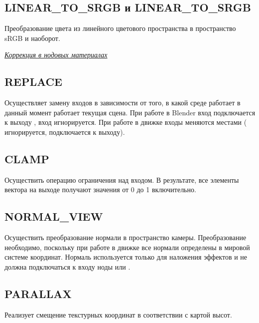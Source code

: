 \documentclass[a4paper,12pt,oneside]{sphinxmanual}
\begin{document}
\subsection{LINEAR\_TO\_SRGB и LINEAR\_TO\_SRGB}
\label{node_materials:linear-to-srgb-linear-to-srgb}
Преобразование цвета из линейного цветового пространства в пространство sRGB и наоборот.




{\hyperref[gamma_alpha:gamma-nodes]{\emph{Коррекция в нодовых материалах}}}




\subsection{REPLACE}
\label{node_materials:replace}
Осуществляет замену входов в зависимости от того, в какой среде работает в данный момент работает текущая сцена. При работе в Blender вход  подключается к выходу , вход  игнорируется. При работе в движке входы меняются местами ( игнорируется,  подключается к выходу).


\subsection{CLAMP}
\label{node_materials:clamp}
Осуществить операцию ограничения над входом. В результате, все элементы вектора на выходе
получают значения от 0 до 1 включительно.


\subsection{NORMAL\_VIEW}
\label{node_materials:normal-view}
Осуществить преобразование нормали в пространство камеры. Преобразование необходимо, поскольку при работе в движке все нормали определены в мировой системе координат. Нормаль используется только для наложения эффектов и не должна подключаться к входу ноды  или .


\subsection{PARALLAX}
\label{node_materials:parallax}
Реализует смещение текстурных координат в соответствии с картой высот.
\end{document}
